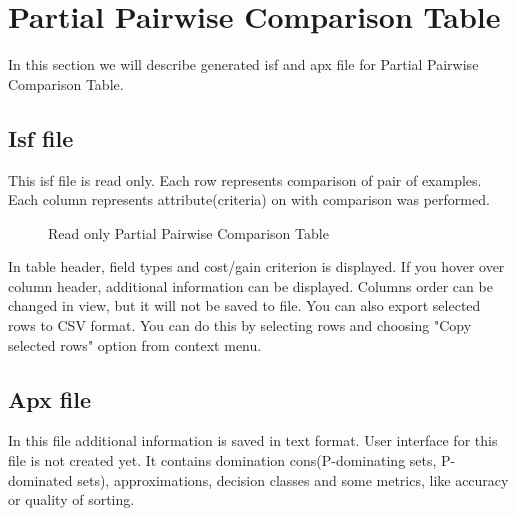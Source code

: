 \section{Partial Pairwise Comparison Table}\label{section:pct}

In this section we will describe generated isf and apx file for Partial Pairwise Comparison Table.

\subsection{Isf file}\label{sub:pct-isf}

This isf file is read only. Each row represents comparison of pair of examples. Each column represents attribute(criteria) on with comparison was performed.

\begin{figure*}[!ht] 
	\centering
	\caption{Read only Partial Pairwise Comparison Table}
\end{figure*}

In table header, field types and cost/gain criterion is displayed. If you hover over column header, additional information can be displayed. Columns order can be changed in view, but it will not be saved to file. You can also export selected rows to CSV format. You can do this by selecting rows and choosing "Copy selected rows" option from context menu.

\subsection{Apx file}\label{sub:pct-apx}

In this file additional information is saved in text format. User interface for this file is not created yet. It contains domination cons(P-dominating sets, P-dominated sets), approximations, decision classes and some metrics, like accuracy or quality of sorting.

\vfill\newpage